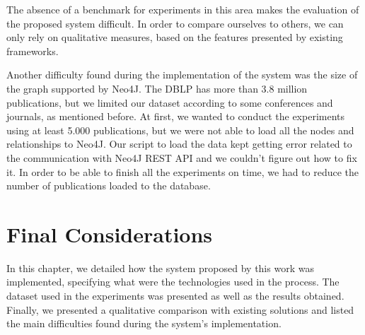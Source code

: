 The absence of a benchmark for experiments in this area makes the evaluation of the proposed system difficult. In order to compare ourselves to others, we can only rely on qualitative measures, based on the features presented by existing frameworks.

Another difficulty found during the implementation of the system was the size of the graph supported by Neo4J. The DBLP has more than 3.8 million publications, but we limited our dataset according to some conferences and journals, as mentioned before. At first, we wanted to conduct the experiments using at least 5.000 publications, but we were not able to load all the nodes and relationships to Neo4J. Our script to load the data kept getting error related to the communication with Neo4J REST API and we couldn't figure out how to fix it. In order to be able to finish all the experiments on time, we had to reduce the number of publications loaded to the database.

\section{Final Considerations}
In this chapter, we detailed how the system proposed by this work was implemented, specifying what were the technologies used in the process. The dataset used in the experiments was presented as well as the results obtained. Finally, we presented a qualitative comparison with existing solutions and listed the main difficulties found during the system's implementation.